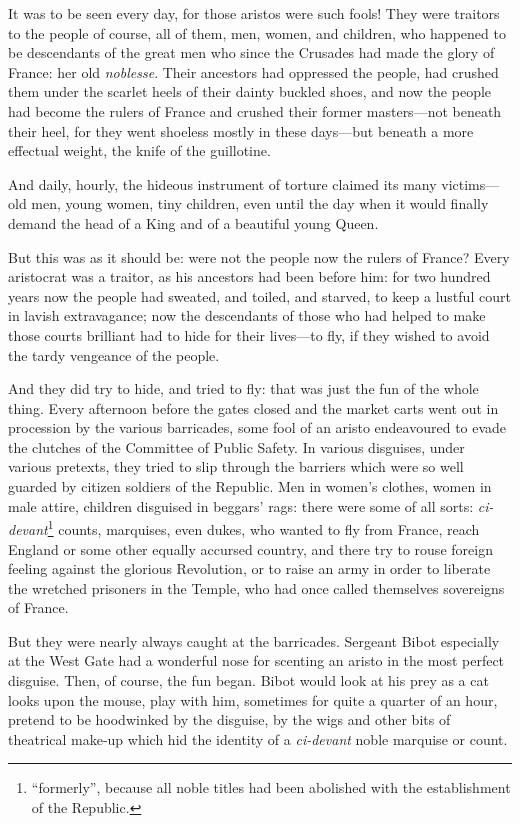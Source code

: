 \documentclass[paper=5.5in:8.5in,BCOR=7mm,twoside,DIV=calc,12pt,usegeometry,chapterprefix,endperiod,headings=big]{scrbook}
\begin{document}
It was to be seen every day, for those aristos were such fools! They were traitors to the people of course, all of them, men, wo\-men, and children, who happened to be descendants of the great men who since the Crusades had made the glory of France: her old \textit{noblesse}. Their ancestors had oppressed the people, had crushed them under the scarlet heels of their dainty buckled shoes, and now the people had become the rulers of France and crushed their former masters---not beneath their heel, for they went shoeless mostly in these days---but beneath a more effectual weight, the knife of the guillotine.

And daily, hourly, the hideous instrument of torture claimed its many victims---old men, young women, tiny children, even until the day when it would finally demand the head of a King and of a beautiful young Queen.

But this was as it should be: were not the people now the rulers of France? Every aristocrat was a traitor, as his ancestors had been before him: for two hundred years now the people had sweated, and toiled, and starved, to keep a lustful court in lavish extravagance; now the descendants of those who had helped to make those courts brilliant had to hide for their lives---to fly, if they wished to avoid the tardy vengeance of the people.

And they did try to hide, and tried to fly: that was just the fun of the whole thing. Every afternoon before the gates closed and the market carts went out in procession by the various barricades, some fool of an aristo endeavoured to evade the clutches of the Committee of Public Safety. In various disguises, under various pretexts, they tried to slip through the barriers which were so well guarded by citizen soldiers of the Republic. Men in women's clothes, women in male attire, children disguised in beggars’ rags: there were some of all sorts: \textit{ci-devant}\footnote{\enquote{formerly}, because all noble titles had been abolished with the establishment of the Republic.} counts, marquises, even dukes, who wanted to fly from France, reach England or some other equally accursed country, and there try to rouse foreign feeling against the glorious Revolution, or to raise an army in order to liberate the wretched prisoners in the Temple, who had once called themselves sovereigns of France.

But they were nearly always caught at the barricades. Sergeant Bibot especially at the West Gate had a wonderful nose for scenting an aristo in the most perfect disguise. Then, of course, the fun began. Bibot would look at his prey as a cat looks upon the mouse, play with him, sometimes for quite a quarter of an hour, pretend to be hoodwinked by the disguise, by the wigs and other bits of theatrical make-up which hid the identity of a \textit{ci-devant} noble marquise or count.
\end{document}
